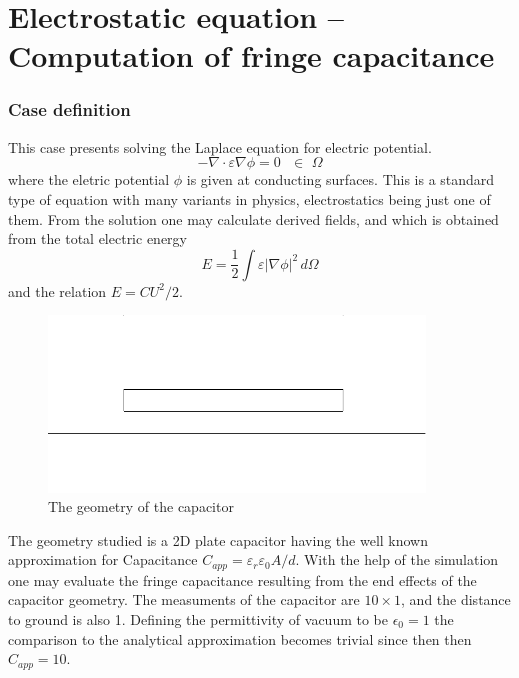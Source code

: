 \chapter{Electrostatic equation -- Computation of fringe capacitance}


\subsection*{Case definition}

This case presents solving the Laplace equation for electric potential.
\begin{equation}
  - \nabla \cdot \varepsilon \nabla \phi = 0  \, \, \, \, \in \, \, \Omega
\end{equation}
where the eletric potential $\phi$ is given at conducting surfaces.
This is a standard type of equation with many variants in physics, electrostatics being just one of them.
From the solution one may calculate 
derived fields, and 
which is obtained from the total electric energy 
\begin{equation}
  E=\frac{1}{2} \int \varepsilon | \nabla \phi |^2 \, d\Omega
\end{equation}
and the relation $E=CU^2/2$.

\begin{figure}[h]
\centering
\includegraphics[width=10cm, viewport=0 20 640 280,clip]{capacitor}
\caption{The geometry of the capacitor}\label{fg:es_capacitor}
\end{figure} 

The geometry studied 
is a 2D plate capacitor having the well known approximation
for Capacitance $C_{app}=\varepsilon_r\varepsilon_0 A/d$.
With the help of the
simulation one may evaluate the fringe capacitance resulting
from the end effects of the capacitor geometry.
The measuments of the capacitor are $10 \times 1$, and the distance to
ground is also 1. Defining the permittivity of vacuum to be 
$\epsilon_0 = 1$ the comparison to the analytical approximation
becomes trivial since then then $C_{app} = 10$. 

